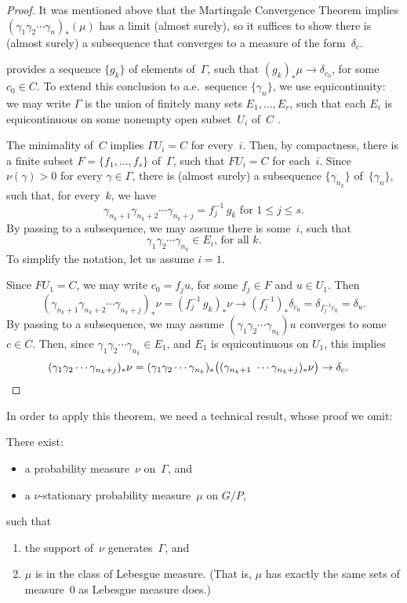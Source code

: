 \begin{proof}
It was mentioned above that the Martingale Convergence Theorem implies $(\gamma_1 \gamma_2 \cdots \gamma_n)_*(\mu)$ has a limit (almost surely), so it suffices to show there is (almost surely) a subsequence that converges to a measure of the form~$\delta_c$.

 provides a sequence $\{g_k\}$ of elements of~$\Gamma$, such that $(g_k)_*\mu \to \delta_{c_0}$, for some $c_0 \in C$. To extend this conclusion to a.e.\ sequence $\{\gamma_n\}$, we use equicontinuity: we may write $\Gamma$ is the union of finitely many sets $E_1,\ldots,E_r$, such that each $E_i$ is equicontinuous on some nonempty open subset~$U_i$ of~$C$ .

The minimality of~$C$ implies $\Gamma U_i = C$ for every~$i$. Then, by compactness, there is a finite subset $F = \{f_1,\ldots,f_s\}$ of~$\Gamma$, such that $F U_i = C$ for each~$i$. Since $\nu(\gamma) > 0$ for every $\gamma \in \Gamma$, there is (almost surely) a subsequence $\{\gamma_{n_k}\}$ of~$\{\gamma_n\}$, such that, for every~$k$, we have
	$$ \text{$\gamma_{n_k+1} \gamma_{n_k+2}\cdots \gamma_{n_k+j} = f_j^{-1} \, g_k$ \ for $1 \le j \le s$} .$$
By passing to a subsequence, we may assume there is some~$i$, such that 
	$$ \text{$\gamma_1 \gamma_2 \cdots \gamma_{n_k} \in E_i$, for all~$k$} .$$
To simplify the notation, let us assume $i = 1$.

Since $F U_1 = C$, we may write $c_0 = f_j u$, for some $f_j \in F$ and $u \in U_1$.
Then
	$$ (\gamma_{n_k+1} \gamma_{n_k+2}\cdots \gamma_{n_k+j})_* \nu = (f_j^{-1} \, g_k)_* \nu \to  (f_j^{-1})_* \delta_{c_0} = \delta_{f_j^{-1} c_0} = \delta_u.$$
By passing to a subsequence, we may assume $(\gamma_1 \gamma_2 \cdots \gamma_{n_k})u$ converges to some $c \in C$. Then, since $\gamma_1 \gamma_2 \cdots \gamma_{n_k} \in E_1$, 
and $E_1$ is equicontinuous on $U_1$, this implies 
	\begin{align*}
	(\gamma_1 \gamma_2 \cdots \gamma_{n_k+j})_* \nu 
	= (\gamma_1 \gamma_2 \cdots \gamma_{n_k})_*  
	\bigl( (\gamma_{n_k+1} \ \cdots \gamma_{n_k+j})_* \nu \bigr)
	\to \delta_c 
	. & \qedhere \end{align*}
\end{proof}

In order to apply this theorem, we need a technical result, whose proof we omit:

\begin{lem} \label{pfsuper-LebesgueStat}
There exist:
	\begin{itemize}
	\item a probability measure~$\nu$ on\/~$\Gamma$,
	and
	\item a $\nu$-stationary probability measure~$\mu$ on $G/P$,
	\end{itemize}
such that 
	\begin{enumerate}
	\item  the support of~$\nu$ generates\/~$\Gamma$,
	and
	\item $\mu$ is in the class of Lebesgue measure. \textup(That is, $\mu$ has exactly the same sets of measure\/~$0$ as Lebesgue measure does.\textup)
	\end{enumerate}
\end{lem}

